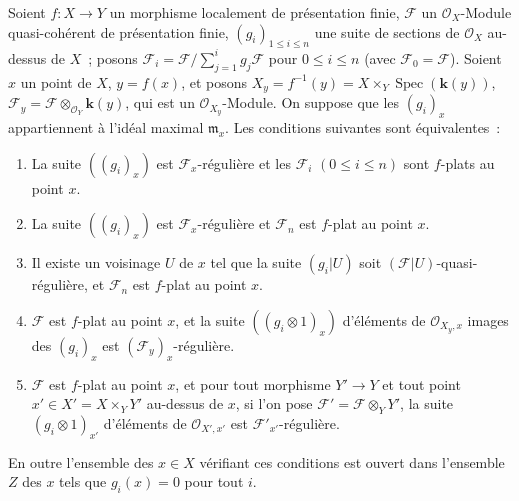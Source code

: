 \begin{theorem}[11.3.8]
\label{IV.11.3.8-fr}
Soient $f:X\to Y$ un morphisme localement de présentation finie,
$\mathcal F$ un $\mathcal O_X$-Module quasi-cohérent de présentation finie,
$(g_i)_{1\leq i\leq n}$ une suite de sections de $\mathcal O_X$ au-dessus de
$X$~; posons
$\mathcal F_i=\mathcal F\big/\sum_{j=1}^{i}g_j\mathcal F$
pour $0\leq i\leq n$
\textup{(}avec $\mathcal F_0=\mathcal F$\textup{)}.
Soient $x$ un point de $X$, $y=f(x)$, et posons
$X_y=f^{-1}(y)=X\times_Y\operatorname{Spec}(\boldsymbol{k}(y))$,
$\mathcal F_y=\mathcal F\otimes_{\mathcal O_Y}\boldsymbol{k}(y)$, qui est un
$\mathcal O_{X_y}$-Module. On suppose que les $(g_i)_x$ appartiennent à l'idéal
maximal $\mathfrak m_x$. Les conditions suivantes sont équivalentes~:
\begin{enumerate}[label=\emph{\alph*)}]
\item La suite $((g_i)_x)$ est $\mathcal F_x$-régulière et les $\mathcal F_i$
$(0\leq i\leq n)$ sont $f$-plats au point $x$.
\item La suite $((g_i)_x)$ est $\mathcal F_x$-régulière et $\mathcal F_n$ est
$f$-plat au point $x$.
\item[\emph{b$'$)}] Il existe un voisinage $U$ de $x$ tel que la suite
$(g_i|U)$ soit $(\mathcal F|U)$-quasi-régulière, et $\mathcal F_n$ est
$f$-plat au point $x$.


\item $\mathcal F$ est $f$-plat au point $x$, et la suite
$((g_i\otimes1)_x)$ d'éléments de $\mathcal O_{X_y,x}$ images des $(g_i)_x$ est
$(\mathcal F_y)_x$-régulière.
\item $\mathcal F$ est $f$-plat au point $x$, et pour tout morphisme
$Y'\to Y$ et tout point $x'\in X'=X\times_YY'$ au-dessus de $x$, si l'on pose
$\mathcal F'=\mathcal F\otimes_YY'$, la suite $(g_i\otimes1)_{x'}$
d'éléments de $\mathcal O_{X',x'}$ est $\mathcal F'_{x'}$-régulière.
\end{enumerate}

En outre l'ensemble des $x\in X$ vérifiant ces conditions est ouvert dans
l'ensemble $Z$ des $x$ tels que $g_i(x)=0$ pour tout $i$.
\end{theorem}

